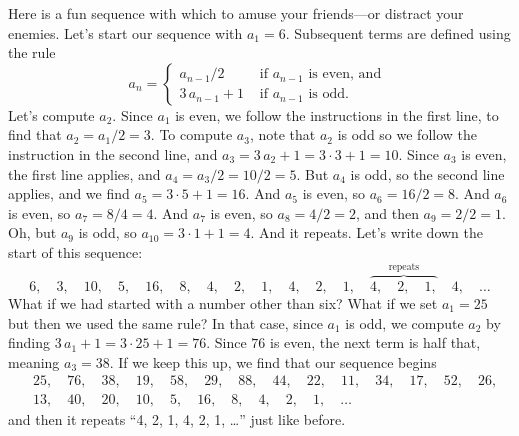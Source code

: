 Here is a fun sequence with which to amuse your friends---or distract
your enemies.  Let's start our sequence with $a_1 = 6$.  Subsequent
terms are defined using the rule
$$
a_n = \begin{cases} a_{n-1} / 2 & \mbox{ if $a_{n-1}$ is even, and } \\
3 \, a_{n-1} + 1 & \mbox{ if $a_{n-1}$ is odd.}
\end{cases}
$$
Let's compute $a_2$.  Since $a_1$ is even, we follow the instructions
in the first line, to find that $a_2 = a_1/2 = 3$. To compute $a_3$,
note that $a_2$ is odd so we follow the instruction in the second
line, and $a_3 = 3 \, a_2 + 1 = 3 \cdot 3 + 1 = 10$.  Since $a_3$ is
even, the first line applies, and $a_4 = a_3 / 2 = 10 / 2 = 5$.  But
$a_4$ is odd, so the second line applies, and we find $a_5 = 3 \cdot 5
+ 1 = 16$.  And $a_5$ is even, so $a_6 = 16 / 2 = 8$.  And $a_6$ is
even, so $a_7 = 8/4 = 4$.  And $a_7$ is even, so $a_8 = 4 / 2 = 2$,
and then $a_9 = 2/2 = 1$.  Oh, but $a_9$ is odd, so $a_{10} = 3 \cdot
1 + 1 = 4$.  And it repeats.  Let's write down the start of this sequence:
$$
6,\quad %
3,\quad %
10,\quad  %
5,\quad  %
16,\quad  %
8,\quad  %
4,\quad  %
2,\quad  %
1,\quad  %
4,\quad %
2,\quad %
1,\quad %
\overbrace{4,\quad %
2,\quad %
1,}^{\mbox{repeats}}\quad %
4,\quad %
\ldots
$$
What if we had started with a number other than six?  What if we set
$a_1 = 25$ but then we used the same rule?  In that case, since $a_1$
is odd, we compute $a_2$ by finding $3 \, a_1 + 1 = 3 \cdot 25 + 1 =
76$.  Since $76$ is even, the next term is half that, meaning $a_3 =
38$.  If we keep this up, we find that our sequence begins
\begin{align*}
&25,\quad 76,\quad 38,\quad 19,\quad 58,\quad 29,\quad 88,\quad 44,\quad 22,\quad 11,\quad 34,\quad 17,\quad 52,\quad 26, \\
&13,\quad 40,\quad 20,\quad 10,\quad 5,\quad 16,\quad 8,\quad 4,\quad 2, \quad 1, \quad \ldots
\end{align*}
and then it repeats ``4, 2, 1, 4, 2, 1, \ldots'' just like before.


